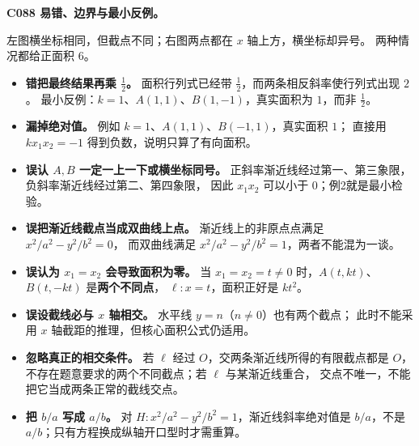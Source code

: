 \clearpage
\begin{trapbox}
\textbf{C088 易错、边界与最小反例。}
\begin{center}\end{center}
左图横坐标相同，但截点不同；右图两点都在 $x$ 轴上方，横坐标却异号。
两种情况都给正面积 $6$。

\begin{itemize}
\item \textbf{错把最终结果再乘 $\tfrac12$。}
面积行列式已经带 $\tfrac12$，而两条相反斜率使行列式出现 $2$。
最小反例：$k=1$、$A(1,1)$、$B(1,-1)$，真实面积为 $1$，而非 $\tfrac12$。

\item \textbf{漏掉绝对值。}
例如 $k=1$、$A(1,1)$、$B(-1,1)$，真实面积 $1$；
直接用 $kx_1x_2=-1$ 得到负数，说明只算了有向面积。

\item \textbf{误认 $A,B$ 一定一上一下或横坐标同号。}
正斜率渐近线经过第一、第三象限，负斜率渐近线经过第二、第四象限，
因此 $x_1x_2$ 可以小于 $0$；例2就是最小检验。

\item \textbf{误把渐近线截点当成双曲线上点。}
渐近线上的非原点点满足 $x^2/a^2-y^2/b^2=0$，
而双曲线满足 $x^2/a^2-y^2/b^2=1$，两者不能混为一谈。

\item \textbf{误认为 $x_1=x_2$ 会导致面积为零。}
当 $x_1=x_2=t\ne0$ 时，$A(t,kt)$、$B(t,-kt)$ 是\textbf{两个不同点}，
$\ell:x=t$，面积正好是 $kt^2$。

\item \textbf{误设截线必与 $x$ 轴相交。}
水平线 $y=n$（$n\ne0$）也有两个截点；
此时不能采用 $x$ 轴截距的推理，但核心面积公式仍适用。

\item \textbf{忽略真正的相交条件。}
若 $\ell$ 经过 $O$，交两条渐近线所得的有限截点都是 $O$，
不存在题意要求的两个不同截点；若 $\ell$ 与某渐近线重合，
交点不唯一，不能把它当成两条正常的截线交点。

\item \textbf{把 $b/a$ 写成 $a/b$。}
对 $H:x^2/a^2-y^2/b^2=1$，渐近线斜率绝对值是
$\boxed{b/a}$，不是 $a/b$；只有方程换成纵轴开口型时才需重算。
\end{itemize}


\end{trapbox}
